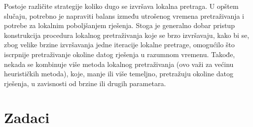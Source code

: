 \documentclass[b5paper, utf8, 11pt, colorlinks]{book}
\theoremstyle{definition}
\begin{document}
   Postoje različite strategije koliko dugo se izvršava lokalna pretraga. U opštem slučaju, potrebno je napraviti balans između utrošenog vremena pretraživanja i potrebe za lokalnim poboljšanjem rješenja. Stoga je generalno dobar pristup konstrukcija  procedura lokalnog pretraživanja koje se brzo izvršavaju, kako bi se, zbog velike brzine izvršavanja jedne iteracije lokalne pretrage, omogućilo što iscrpnije pretraživanje okoline datog rješenja u razumnom vremenu. Takođe, nekada se kombinuje više metoda lokalnog pretraživanja (ovo važi za većinu heurističkih metoda), koje, manje ili više temeljno, pretražuju okoline datog rješenja, u zavisnosti od brzine ili drugih parametara.



 \section{Zadaci}
\end{document}
